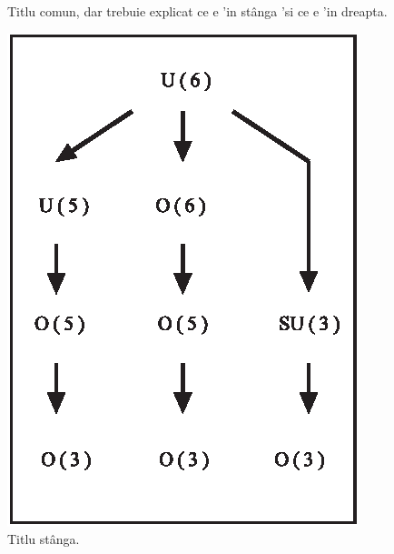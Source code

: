 \begin{figure}[ht]
\begin{minipage}{0.5\textwidth}
\end{minipage}
\caption{Titlu comun, dar trebuie explicat ce e 'in st\^anga 'si ce e 'in dreapta.}
\label{fig:figura_exemplu2}       
\end{figure}

\begin{figure}[ht]  %
\begin{minipage}{0.5\textwidth}
\centering
\includegraphics{tex_files/figs/authorfig1.eps}
\caption{Titlu st\^anga.}
\label{fig:figura_exemplu3}       
\end{minipage}
\begin{minipage}{0.5\textwidth}
\centering

\end{minipage}
\end{figure}
